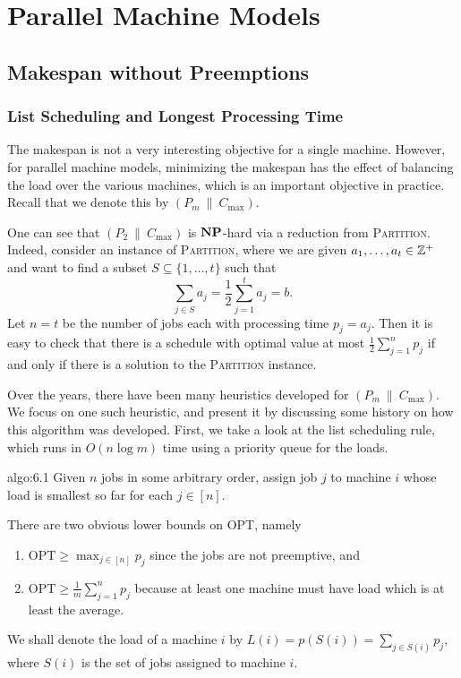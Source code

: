 \section{Parallel Machine Models} \label{sec:6}

\subsection{Makespan without Preemptions} \label{subsec:6.1}

\subsubsection{List Scheduling and Longest Processing Time} \label{subsubsec:6.1.1}
The makespan is not a very interesting objective for a single machine. 
However, for parallel machine models, minimizing the makespan has the effect 
of balancing the load over the various machines, which is an important 
objective in practice. Recall that we denote this by $(P_m~\|~C_{\max})$.

One can see that $(P_2~\|~C_{\max})$ is $\operatorname{\textbf{NP}}$-hard via a reduction from 
\textsc{Partition}. Indeed, consider an instance of \textsc{Partition}, 
where we are given $a_1, \dots, a_t \in \mathbb{Z}^+$ and want to find a subset 
$S \subseteq \{1, \dots, t\}$ such that 
\[ \sum_{j\in S} a_j = \frac12 \sum_{j=1}^t a_j = b. \] 
Let $n = t$ be the number of jobs each with processing time $p_j = a_j$. Then 
it is easy to check that there is a schedule with optimal value at most 
$\frac12 \sum_{j=1}^n p_j$ if and only if there is a solution to the 
\textsc{Partition} instance. 

Over the years, there have been many heuristics developed for 
$(P_m~\|~C_{\max})$. We focus on one such heuristic, and present it by 
discussing some history on how this algorithm was developed. First, we 
take a look at the list scheduling rule, which runs in $O(n\log m)$ time 
using a priority queue for the loads. 

\begin{algo}{algo:6.1}
    Given $n$ jobs in some arbitrary order, assign job $j$ to machine $i$ 
    whose load is smallest so far for each $j \in [n]$. 
\end{algo}

There are two obvious lower bounds on OPT, namely 
\begin{enumerate}[(1)]
    \item $\text{OPT} \geq \max_{j\in[n]} p_j$ since the jobs are not preemptive, and 
    \item $\text{OPT} \geq \frac1m \sum_{j=1}^n p_j$ because at least one machine must 
    have load which is at least the average. 
\end{enumerate}
We shall denote the load of a machine $i$ by $L(i) = p(S(i)) = 
\sum_{j\in S(i)} p_j$, where $S(i)$ is the set of jobs assigned to machine $i$.


